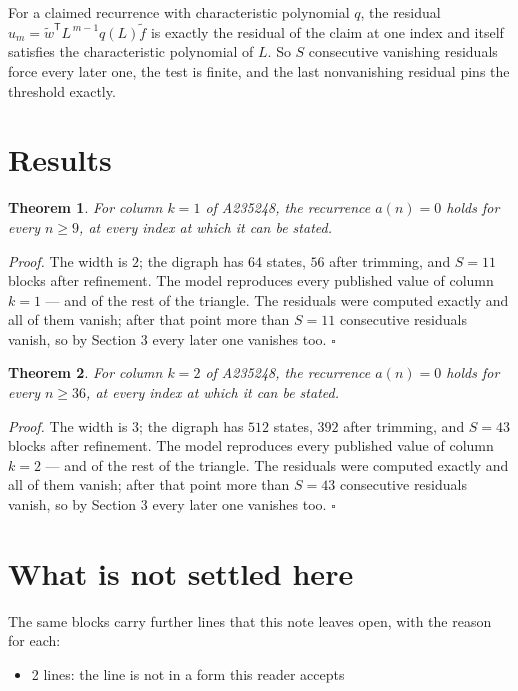 \documentclass[11pt]{article}
\newtheorem{theorem}{Theorem}
\theoremstyle{definition}
\begin{document}
For a claimed recurrence with characteristic polynomial $q$, the residual $u_m = \tilde w^{\mathsf T}L^{\,m-1}q(L)\tilde f$ is exactly the residual of the claim at one index and itself satisfies the characteristic polynomial of $L$. So $S$ consecutive vanishing residuals force every later one, the test is finite, and the last nonvanishing residual pins the threshold exactly.

\section{Results}

\begin{theorem} For column $k = 1$ of A235248, the recurrence $a(n) = 0$ holds for every $n \ge 9$, at every index at which it can be stated.\end{theorem}

{\itshape Proof.} The width is $2$; the digraph has $64$ states, $56$ after trimming, and $S = 11$ blocks after refinement. The model reproduces every published value of column $k = 1$ --- and of the rest of the triangle. The residuals were computed exactly and all of them vanish; after that point more than $S = 11$ consecutive residuals vanish, so by Section 3 every later one vanishes too. $\square$

\begin{theorem} For column $k = 2$ of A235248, the recurrence $a(n) = 0$ holds for every $n \ge 36$, at every index at which it can be stated.\end{theorem}

{\itshape Proof.} The width is $3$; the digraph has $512$ states, $392$ after trimming, and $S = 43$ blocks after refinement. The model reproduces every published value of column $k = 2$ --- and of the rest of the triangle. The residuals were computed exactly and all of them vanish; after that point more than $S = 43$ consecutive residuals vanish, so by Section 3 every later one vanishes too. $\square$

\section{What is not settled here}

The same blocks carry further lines that this note leaves open, with the reason for each:

\begin{itemize}

\item 2 lines: the line is not in a form this reader accepts

\end{itemize}
\end{document}
